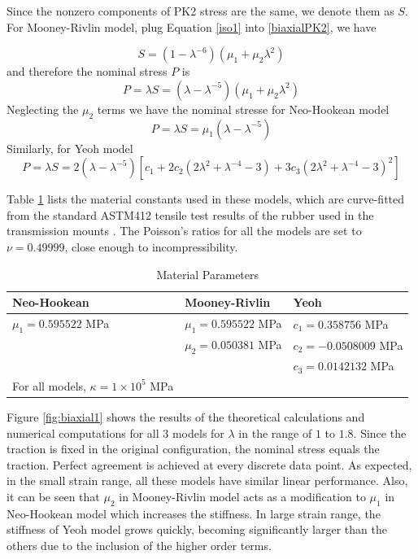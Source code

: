 Since the nonzero components of PK2 stress are the same, we denote them as $S$. For Mooney-Rivlin model, plug Equation \ref{iso1} into \ref{biaxialPK2}, we have

\begin{equation}
S = (1 - {\lambda}^{-6})(\mu_1 + \mu_2{\lambda}^2)
\end{equation}
and therefore the nominal stress $P$ is
\begin{equation}
P = \lambda S =  (\lambda - {\lambda}^{-5})(\mu_1 + \mu_2{\lambda}^2)
\end{equation}
Neglecting the $\mu_2$ terms we have the nominal stresse for Neo-Hookean model
\begin{equation}
P = \lambda S =  \mu_1(\lambda - {\lambda}^{-5})
\end{equation}
Similarly, for Yeoh model
\begin{equation}
P = \lambda S = 2(\lambda - {\lambda}^{-5})[c_1 + 2c_2(2{\lambda}^2 + {\lambda}^{-4} - 3) + 3c_3(2{\lambda}^2 + {\lambda}^{-4} - 3)^2]
\end{equation}



Table \ref{parameters} lists the material constants used in these models, which are curve-fitted from the standard ASTM412 tensile test results of the rubber used in the transmission mounts \cite{Sharma}. The Poisson's ratios for all the models are set to $\nu = 0.49999$, close enough to incompressibility.

\begin{table}[H]
\centering
\caption{Material Parameters}
\begin{tabular} { l  l  l }
	\hline
	Neo-Hookean & Mooney-Rivlin & Yeoh \\
	\hline
	$\mu_1 = 0.595522$ MPa & $\mu_1 = 0.595522$ MPa & $c_1 = 0.358756$ MPa \\
	& $\mu_2 = 0.050381$ MPa & $c_2 = - 0.0508009$ MPa \\
	& & $c_3 = 0.0142132$ MPa \\
	\hline
	For all models, $\kappa = 1 \times 10^5 $ MPa \\
	\hline
\end{tabular}
\label{parameters}
\end{table}

Figure \ref{fig:biaxial1} shows the results of the theoretical calculations and numerical computations for all $3$ models for $\lambda$ in the range of $1$ to $1.8$. Since the traction is fixed in the original configuration, the nominal stress equals the traction. Perfect agreement is achieved at every discrete data point. As expected, in the small strain range, all these models have similar linear performance. Also, it can be seen that $\mu_2$ in Mooney-Rivlin model acts as a modification to $\mu_1$ in Neo-Hookean model which increases the stiffness. In large strain range, the stiffness of Yeoh model grows quickly, becoming significantly larger than the others due to the inclusion of the higher order terms.



